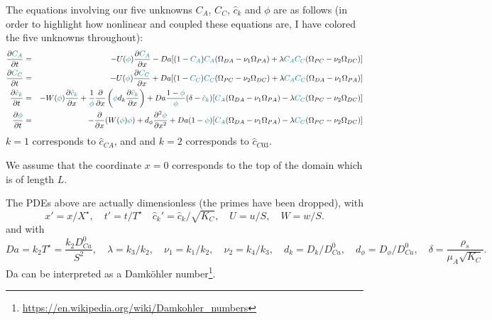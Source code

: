 \documentclass[a4paper]{article}
\newcommand{\nn}{\nonumber}
\begin{document}
The equations involving our five unknowns $C_A$, $C_C$, $\hat{c}_k$ and $\phi$ are as follows (in
order to highlight how nonlinear and coupled these equations are, I have colored the 
five unknowns throughout):
\begin{eqnarray}
\frac{\partial {\color{teal} C_A}}{\partial t} 
&=& -U({\color{teal}\phi}) \frac{\partial {\color{teal}C_A}}{\partial x} 
- Da[(1-{\color{teal}C_A}){\color{teal}C_A}(\Omega_{DA}-\nu_1\Omega_{PA})+
\lambda {\color{teal}C_AC_C} (\Omega_{PC}-\nu_2\Omega_{DC})]
\nn\\
\frac{\partial {\color{teal}C_C}}{\partial t} 
&=& -U({\color{teal}\phi}) \frac{\partial {\color{teal}C_C}}{\partial x}  
+ Da[(1-{\color{teal}C_C}){\color{teal}C_C}(\Omega_{PC}-\nu_2\Omega_{DC})+
\lambda {\color{teal}C_AC_C} (\Omega_{DA}-\nu_1\Omega_{PA})]
\nn\\
\frac{\partial {\color{teal}\hat{c}_k}}{\partial t} 
&=& -W({\color{teal}\phi}) \frac{\partial {\color{teal}\hat{c}_k}}{\partial x}
+\frac{1}{\color{teal}\phi} \frac{\partial}{\partial x} 
\left( {\color{teal}\phi} d_k \frac{\partial {\color{teal}\hat{c}_k}}{\partial x} \right)
+Da \frac{1-{\color{teal}\phi}}{{\color{teal}\phi}}(\delta-{\color{teal}\hat{c}_k})
[{\color{teal}C_A}(\Omega_{DA}-\nu_1\Omega_{PA})-\lambda 
{\color{teal}C_C} (\Omega_{PC}-\nu_2 \Omega_{DC})  ]
\nn\\ 
\frac{\partial {\color{teal}\phi}}{\partial t} 
&=& -\frac{\partial}{\partial x} (W({\color{teal}\phi}) {\color{teal}\phi})
+d_{\phi} \frac{\partial^2 {\color{teal}\phi}}{\partial x^2} + Da (1-{\color{teal}\phi})
[{\color{teal}C_A}(\Omega_{DA}-\nu_1 \Omega_{PA})-\lambda 
{\color{teal}C_C} (\Omega_{PC}-\nu_2 \Omega_{DC})] \nn
\end{eqnarray}
$k=1$ corresponds to $\hat{c}_{CA}$, and
and $k=2$ corresponds to $\hat{c}_{C03}$.

We assume that the coordinate $x=0$ corresponds to the top of the domain
which is of length $L$. 

The PDEs above are actually dimensionless (the primes have been dropped), with 
\[
x'=x/X^\star, \quad t'=t/T^\star \quad \hat{c}_k'=\hat{c}_k/\sqrt{K_C},
\quad U=u/S, \quad W=w/S.
\]
and with 
\[
Da=k_2 T^\star = \frac{k_2 D_{Ca}^0}{S^2},
\quad
\lambda=k_3/k_2,
\quad
\nu_1=k_1/k_2,
\quad
\nu_2=k_4/k_3,
\quad
d_k=D_k/D_{Ca}^0, 
\quad
d_\phi=D_\phi/D_{Ca}^0,
\quad
\delta=\frac{\rho_s}{\mu_A \sqrt{K_C}}.
\]
Da can be interpreted as a Damköhler number\footnote{\url{https://en.wikipedia.org/wiki/Damkohler_numbers}}. 
\end{document}
